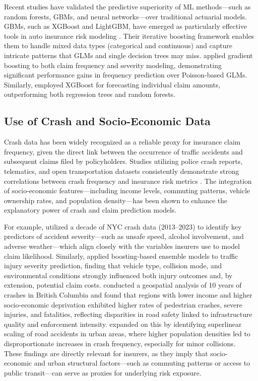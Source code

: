 \documentclass[
  number,
  review,
  3p]{elsarticle}
\begin{document}
Recent studies have validated the predictive superiority of ML
methods---such as random forests, GBMs, and neural networks---over
traditional actuarial models. GBMs, such as XGBoost and LightGBM, have
emerged as particularly effective tools in auto insurance risk modeling
\citep{henckaerts}. Their iterative boosting framework enables them to
handle mixed data types (categorical and continuous) and capture
intricate patterns that GLMs and single decision trees may miss.
\citet{clemente} applied gradient boosting to both claim frequency and
severity modeling, demonstrating significant performance gains in
frequency prediction over Poisson-based GLMs. Similarly,
\citet{jonkheijm} employed XGBoost for forecasting individual claim
amounts, outperforming both regression trees and random forests.

\subsection{\texorpdfstring{\textbf{Use of Crash and Socio-Economic
Data}}{Use of Crash and Socio-Economic Data}}\label{use-of-crash-and-socio-economic-data}

Crash data has been widely recognized as a reliable proxy for insurance
claim frequency, given the direct link between the occurrence of traffic
accidents and subsequent claims filed by policyholders. Studies
utilizing police crash reports, telematics, and open transportation
datasets consistently demonstrate strong correlations between crash
frequency and insurance risk metrics \citep{takale}. The integration of
socio-economic features---including income levels, commuting patterns,
vehicle ownership rates, and population density---has been shown to
enhance the explanatory power of crash and claim prediction models.

For example, \citet{adeniyi} utilized a decade of NYC crash data
(2013--2023) to identify key predictors of accident severity---such as
unsafe speed, alcohol involvement, and adverse weather---which align
closely with the variables insurers use to model claim likelihood.
Similarly, \citet{dong} applied boosting-based ensemble models to
traffic injury severity prediction, finding that vehicle type, collision
mode, and environmental conditions strongly influenced both injury
outcomes and, by extension, potential claim costs. \citet{brubacher}
conducted a geospatial analysis of 10 years of crashes in British
Columbia and found that regions with lower income and higher
socio-economic deprivation exhibited higher rates of pedestrian crashes,
severe injuries, and fatalities, reflecting disparities in road safety
linked to infrastructure quality and enforcement intensity.
\citet{cabrera} expanded on this by identifying superlinear scaling of
road accidents in urban areas, where higher population densities led to
disproportionate increases in crash frequency, especially for minor
collisions. These findings are directly relevant for insurers, as they
imply that socio-economic and urban structural factors---such as
commuting patterns or access to public transit---can serve as proxies
for underlying risk exposure.
\end{document}
